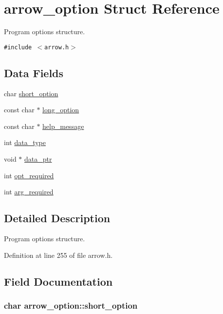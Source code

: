 \hypertarget{structarrow__option}{
\section{arrow\_\-option Struct Reference}
\label{structarrow__option}
}
Program options structure.  


{\tt \#include $<$arrow.h$>$}

\subsection*{Data Fields}
\begin{CompactItemize}
\item 
char \hyperlink{structarrow__option_f47f3010fcddb84f4a67920db03d7233}{short\_\-option}
\item 
const char $\ast$ \hyperlink{structarrow__option_3d8ddc7b0d627a15c7108e21a16cb51a}{long\_\-option}
\item 
const char $\ast$ \hyperlink{structarrow__option_48bfe5bda71cd04d92067b203ffb92ce}{help\_\-message}
\item 
int \hyperlink{structarrow__option_c97df040be0b7c76e92556087be21ff8}{data\_\-type}
\item 
void $\ast$ \hyperlink{structarrow__option_0b4e8cc50fdb7d8fbb1e63db30cd172d}{data\_\-ptr}
\item 
int \hyperlink{structarrow__option_2e7290d4b7088eab30df5f3bfc34ce93}{opt\_\-required}
\item 
int \hyperlink{structarrow__option_59aa495c8bd2e4d57014e4d9278020ed}{arg\_\-required}
\end{CompactItemize}


\subsection{Detailed Description}
Program options structure. 

Definition at line 255 of file arrow.h.

\subsection{Field Documentation}
\hypertarget{structarrow__option_f47f3010fcddb84f4a67920db03d7233}{
\subsubsection{\setlength{\rightskip}{0pt plus 5cm}char {\bf arrow\_\-option::short\_\-option}}}
\label{structarrow__option_f47f3010fcddb84f4a67920db03d7233}


